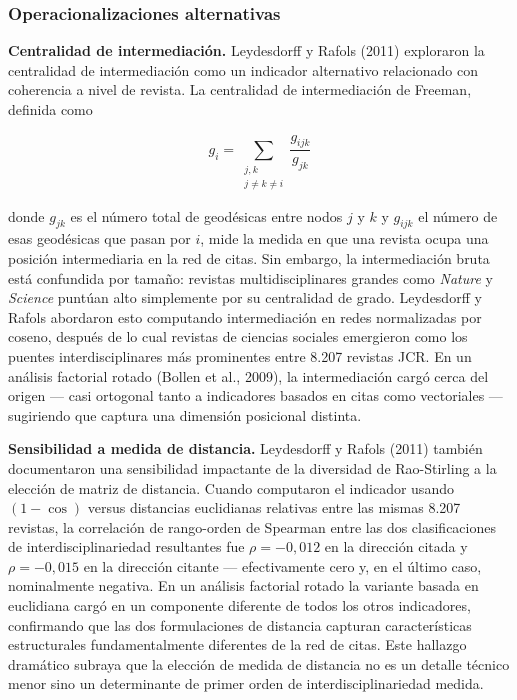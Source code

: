 \documentclass[
]{article}
\begin{document}
\hypertarget{operacionalizaciones-alternativas}{%
\subsubsection{Operacionalizaciones
alternativas}\label{operacionalizaciones-alternativas}}

\textbf{Centralidad de intermediación.} Leydesdorff y Rafols (2011)
exploraron la centralidad de intermediación como un indicador
alternativo relacionado con coherencia a nivel de revista. La
centralidad de intermediación de Freeman, definida como

\[g_i = \sum_{\substack{j,k \\ j \neq k \neq i}}
        \frac{g_{ijk}}{g_{jk}}\]

donde \(g_{jk}\) es el número total de geodésicas entre nodos \(j\) y
\(k\) y \(g_{ijk}\) el número de esas geodésicas que pasan por \(i\),
mide la medida en que una revista ocupa una posición intermediaria en la
red de citas. Sin embargo, la intermediación bruta está confundida por
tamaño: revistas multidisciplinares grandes como \emph{Nature} y
\emph{Science} puntúan alto simplemente por su centralidad de grado.
Leydesdorff y Rafols abordaron esto computando intermediación en redes
normalizadas por coseno, después de lo cual revistas de ciencias
sociales emergieron como los puentes interdisciplinares más prominentes
entre 8.207 revistas JCR. En un análisis factorial rotado (Bollen et
al., 2009), la intermediación cargó cerca del origen --- casi ortogonal
tanto a indicadores basados en citas como vectoriales --- sugiriendo que
captura una dimensión posicional distinta.

\textbf{Sensibilidad a medida de distancia.} Leydesdorff y Rafols (2011)
también documentaron una sensibilidad impactante de la diversidad de
Rao-Stirling a la elección de matriz de distancia. Cuando computaron el
indicador usando \((1 - \cos)\) versus distancias euclidianas relativas
entre las mismas 8.207 revistas, la correlación de rango-orden de
Spearman entre las dos clasificaciones de interdisciplinariedad
resultantes fue \(\rho = -0,012\) en la dirección citada y
\(\rho = -0,015\) en la dirección citante --- efectivamente cero y, en
el último caso, nominalmente negativa. En un análisis factorial rotado
la variante basada en euclidiana cargó en un componente diferente de
todos los otros indicadores, confirmando que las dos formulaciones de
distancia capturan características estructurales fundamentalmente
diferentes de la red de citas. Este hallazgo dramático subraya que la
elección de medida de distancia no es un detalle técnico menor sino un
determinante de primer orden de interdisciplinariedad medida.
\end{document}
